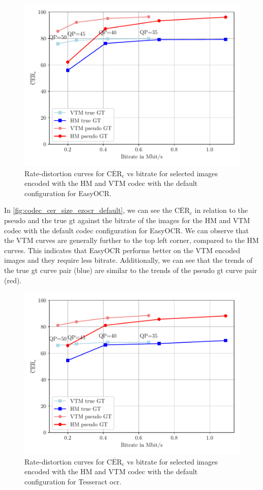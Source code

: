 \begin{figure}
    \centering
    \includegraphics[width=\textwidth]{../images/analyze/codec_cer_size_ezocr_default.pdf}
    \caption{Rate-distortion curves for $\overline{\text{CER}}_{\text{c}}$ vs bitrate for selected images encoded with the HM and VTM codec with the default configuration for EasyOCR.}
    \label{fig:codec_cer_size_ezocr_default}
\end{figure}
In \autoref{fig:codec_cer_size_ezocr_default}, we can see the $\overline{\text{CER}}_{\text{c}}$ in relation to the pseudo and the true \gls{gt} against the bitrate of the images for the HM and VTM codec with the default codec configuration for EasyOCR.
We can observe that the VTM curves are generally further to the top left corner, compared to the HM curves.
This indicates that EasyOCR performs better on the VTM encoded images and they require less bitrate.
Additionally, we can see that the trends of the true \gls{gt} curve pair (blue) are similar to the trends of the pseudo \gls{gt} curve pair (red).
\begin{figure}
    \centering
    \includegraphics[width=\textwidth]{../images/analyze/codec_cer_size_tess_default.pdf}
    \caption{Rate-distortion curves for $\overline{\text{CER}}_{\text{c}}$ vs bitrate for selected images encoded with the HM and VTM codec with the default configuration for Tesseract \gls{ocr}.}
    \label{fig:codec_cer_size_tess_default}
\end{figure}
